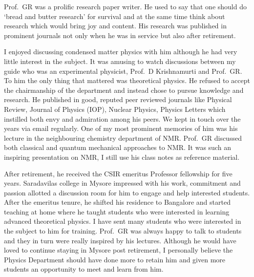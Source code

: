 Prof.\ GR was a prolific research paper writer. He used to say that one should do `bread and butter research' for survival and at the same time think about research which would bring joy and content. His research was published in prominent journals not only when he was in service but also after retirement.

I enjoyed discussing condensed matter physics with him although he had very little interest in the subject. It was
amusing to watch discussions between my guide who was an experimental physicist, Prof.\ D Krishnamurti and
Prof.\ GR. To him the only thing that mattered was theoretical physics. He refused to accept the chairmanship
of the department and instead chose to pursue knowledge and research. He published in good, reputed peer
reviewed journals like Physical Review, Journal of Physics (IOP), Nuclear Physics, Physics Letters which instilled
both envy and admiration among his peers. We kept in touch over the years via email regularly. One of my most prominent memories of him was his lecture in the neighbouring chemistry department of NMR. Prof.\ GR discussed 
both classical and quantum mechanical approaches to NMR. It was such an inspiring presentation on NMR, I still
use his class notes as reference material.

After retirement, he received the CSIR emeritus Professor fellowship for five years. Saradavilas college in
Mysore impressed with his work, commitment and passion allotted a discussion room for him to engage and
help interested students. After the emeritus tenure, he shifted his residence to Bangalore and started teaching at
home where he taught students who were interested in learning advanced theoretical physics. I have sent many
students who were interested in the subject to him for training. Prof.\ GR was always happy to talk to students and
they in turn were really inspired by his lectures. Although he would have loved to continue staying in Mysore post
retirement, I personally believe the Physics Department should have done more to retain him and given more
students an opportunity to meet and learn from him.
\newpage

